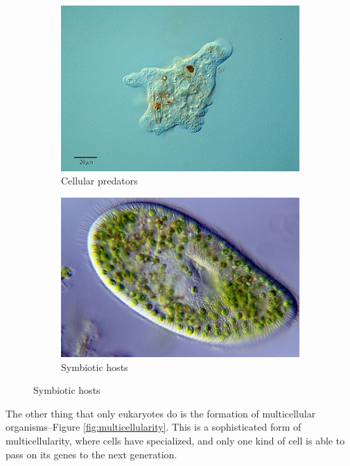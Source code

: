 \documentclass[]{article}
\begin{document}
\begin{figure}[H]
	\caption{Cellular predators, symbiotic hosts}
	\label{figs:Cellular:predators:symbiotic:hosts}
	\begin{subfigure}[b]{0.45\textwidth}
		\caption{ Cellular predators}
		\label{figs:Cellular:predators:symbiotic:hosts1}
		\includegraphics[width=\textwidth]{Eukaryotes1}
	\end{subfigure}
	\begin{subfigure}[b]{0.45\textwidth}
		\caption{Symbiotic hosts }
		\label{figs:Cellular:predators:symbiotic:hosts2}
		\includegraphics[width=\textwidth]{Eukaryotes2}
	\end{subfigure}
\end{figure}

The other thing that only eukaryotes do is the formation of multicellular organisms--Figure \ref{fig:multicellularity}. This is a sophisticated form of multicellularity, where cells have specialized, and only one kind of cell is able to pass on its genes to the next generation.
\end{document}
